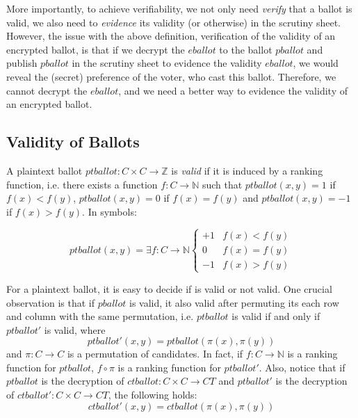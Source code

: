 \noindent
More importantly,  to achieve verifiability, we not only need \emph{verify}
that a ballot is valid, we also need to \emph{evidence} its validity
(or otherwise) in the scrutiny sheet.   However,  the issue with the above 
definition,  verification of the validity of an encrypted ballot, is that if we decrypt 
the $eballot$ to the ballot $pballot$ and publish $pballot$  in the scrutiny sheet 
to evidence the validity $eballot$,   
we would reveal the (secret) preference of the voter,  who cast this ballot. 
Therefore, we cannot decrypt the $eballot$, and we need a better way to evidence 
the validity of an encrypted ballot. 


\subsection{Validity of Ballots}
\label{sec:valid-pb}
A plaintext ballot $ptballot : C \times C \to \mathbb{Z}$ 
is \emph{valid} if it is induced by a ranking function, i.e.
there exists a function $f: C \to \mathbb{N}$ such that $ptballot(x, y) = 1$ if
$f(x) < f(y)$, $ptballot(x, y) = 0$ if $f(x) = f(y)$ and $ptballot(x, y) = -1$ if
$f(x) > f(y)$.  In symbols:

\[ ptballot(x, y) =  \exists f : C \to \mathbb{N}  \begin{cases} +1 & f(x) < f(y) \\ 0 &
f(x) = f(y) \\ -1 & f(x) > f(y) \end{cases} \]



\noindent
For a plaintext ballot, it is easy to decide if is valid 
or not valid.  One crucial observation is that if $pballot$ is valid, 
it also valid after permuting its each row and column with the 
same permutation, i.e.  $ptballot$ is valid if and only if $ptballot'$ is 
valid, where
\[ ptballot'(x,y) = ptballot(\pi(x), \pi(y)) \]
and $\pi: C \to C$ is a permutation of candidates.
In fact, if $f : C \to \mathbb{N}$ is a ranking function for $ptballot$, 
$f \circ \pi$ is a ranking function for $ptballot'$.   Also, notice that
if $ptballot$ is the decryption of  $ctballot : C \times C \to CT$
and $ptballot'$ is the decryption of $ctballot' : C \times C \to CT$,  
the following holds:
\[ ctballot'(x,y) = ctballot(\pi(x), \pi(y)) \]


